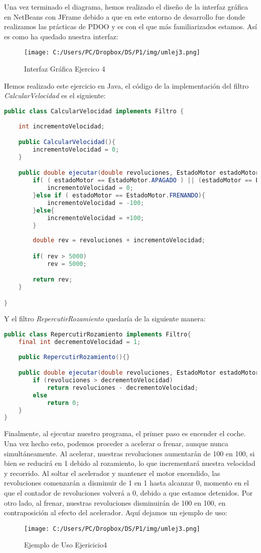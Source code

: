 \documentclass{article}
\begin{document}
Una vez terminado el diagrama, hemos realizado el diseño de la interfaz gráfica en NetBeans con JFrame debido a que en este entorno de desarrollo fue donde realizamos las prácticas de PDOO y es con el que más familiarizados estamos. Así es como ha quedado nuestra interfaz:
\begin{figure}[H]
\centering
\texttt{[image: C:/Users/PC/Dropbox/DS/P1/img/umlej3.png]}
\caption{Interfaz Gráfica Ejercico 4}
\end{figure}
Hemos realizado este ejercicio en Java, el código de la implementación del filtro \textit{CalcularVelocidad} es el siguiente:
 \begin{lstlisting}[language=Java, caption={CalcularVelocidad.java}]
   public class CalcularVelocidad implements Filtro {
    
    int incrementoVelocidad;

    public CalcularVelocidad(){
        incrementoVelocidad = 0;
    }

    public double ejecutar(double revoluciones, EstadoMotor estadoMotor){
        if( ( estadoMotor == EstadoMotor.APAGADO ) || (estadoMotor == EstadoMotor.ENCENDIDO)){
            incrementoVelocidad = 0;
        }else if ( estadoMotor == EstadoMotor.FRENANDO){
            incrementoVelocidad = -100;
        }else{
            incrementoVelocidad = +100;
        }
        
        double rev = revoluciones + incrementoVelocidad;

        if( rev > 5000)
            rev = 5000;

        return rev;
    }

}
\end{lstlisting}
Y el filtro \textit{RepercutirRozamiento} quedaría de la siguiente manera:
 \begin{lstlisting}[language=Java, caption={RepercutirRozamiento.java}]
public class RepercutirRozamiento implements Filtro{
    final int decrementoVelocidad = 1;
    
    public RepercutirRozamiento(){}

    public double ejecutar(double revoluciones, EstadoMotor estadoMotor){
        if (revoluciones > decrementoVelocidad)
            return revoluciones - decrementoVelocidad;
        else 
            return 0;
    }
}
\end{lstlisting}
Finalmente, al ejecutar nuestro programa, el primer paso es encender el coche. Una vez hecho esto, podemos proceder a acelerar o frenar, aunque nunca simultáneamente. Al acelerar, nuestras revoluciones aumentarán de 100 en 100, si bien se reducirá en 1 debido al rozamiento, lo que incrementará nuestra velocidad y recorrido. Al soltar el acelerador y mantener el motor encendido, las revoluciones comenzarán a disminuir de 1 en 1 hasta alcanzar 0, momento en el que el contador de revoluciones volverá a 0, debido a que estamos detenidos. Por otro lado, al frenar, nuestras revoluciones disminuirán de 100 en 100, en contraposición al efecto del acelerador. Aquí dejamos un ejemplo de uso:
\begin{figure}[H]
\centering
\texttt{[image: C:/Users/PC/Dropbox/DS/P1/img/umlej3.png]}
\caption{Ejemplo de Uso Ejericicio4}
\end{figure}
\end{document}
